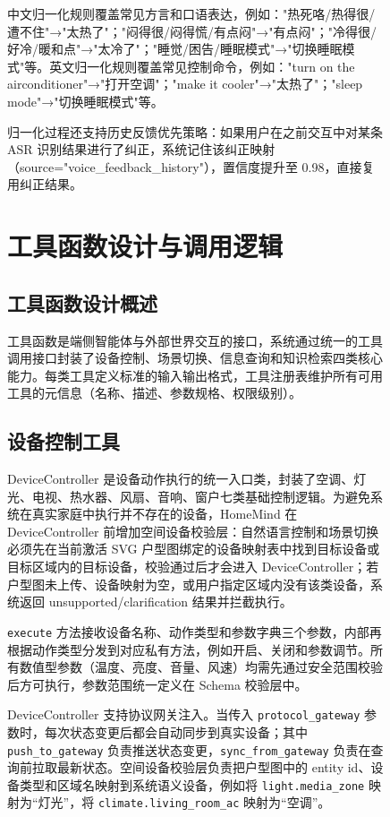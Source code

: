 \documentclass[12pt,a4paper,oneside]{ctexrep}
\begin{document}
\begin{figure}[H]
中文归一化规则覆盖常见方言和口语表达，例如："热死咯/热得很/遭不住"→"太热了"；"闷得很/闷得慌/有点闷"→"有点闷"；"冷得很/好冷/暖和点"→"太冷了"；"睡觉/困告/睡眠模式"→"切换睡眠模式"等。英文归一化规则覆盖常见控制命令，例如："turn on the airconditioner"→"打开空调"；"make it cooler"→"太热了"；"sleep mode"→"切换睡眠模式"等。

归一化过程还支持历史反馈优先策略：如果用户在之前交互中对某条 ASR 识别结果进行了纠正，系统记住该纠正映射（source="voice\_feedback\_history"），置信度提升至 0.98，直接复用纠正结果。

\chapter{工具函数设计与调用逻辑}

\section{工具函数设计概述}

工具函数是端侧智能体与外部世界交互的接口，系统通过统一的工具调用接口封装了设备控制、场景切换、信息查询和知识检索四类核心能力。每类工具定义标准的输入输出格式，工具注册表维护所有可用工具的元信息（名称、描述、参数规格、权限级别）。

\section{设备控制工具}

DeviceController 是设备动作执行的统一入口类，封装了空调、灯光、电视、热水器、风扇、音响、窗户七类基础控制逻辑。为避免系统在真实家庭中执行并不存在的设备，HomeMind 在 DeviceController 前增加空间设备校验层：自然语言控制和场景切换必须先在当前激活 SVG 户型图绑定的设备映射表中找到目标设备或目标区域内的目标设备，校验通过后才会进入 DeviceController；若户型图未上传、设备映射为空，或用户指定区域内没有该类设备，系统返回 unsupported/clarification 结果并拦截执行。

\texttt{execute} 方法接收设备名称、动作类型和参数字典三个参数，内部再根据动作类型分发到对应私有方法，例如开启、关闭和参数调节。所有数值型参数（温度、亮度、音量、风速）均需先通过安全范围校验后方可执行，参数范围统一定义在 Schema 校验层中。

DeviceController 支持协议网关注入。当传入 \texttt{protocol\_gateway} 参数时，每次状态变更后都会自动同步到真实设备；其中 \texttt{push\_to\_gateway} 负责推送状态变更，\texttt{sync\_from\_gateway} 负责在查询前拉取最新状态。空间设备校验层负责把户型图中的 entity id、设备类型和区域名映射到系统语义设备，例如将 \texttt{light.media\_zone} 映射为“灯光”，将 \texttt{climate.living\_room\_ac} 映射为“空调”。


\end{figure}
\end{document}
